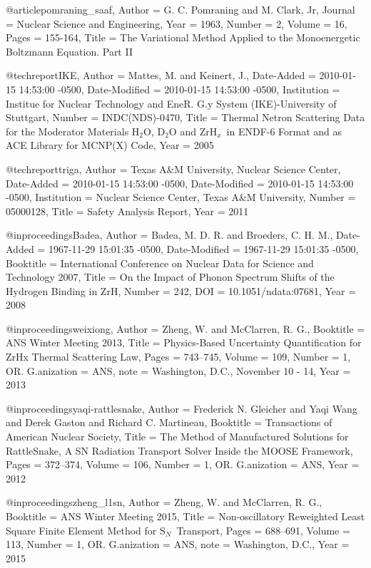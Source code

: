 @article{pomraning_saaf,
    Author = {G. C. Pomraning and M. Clark, Jr},
    Journal = {Nuclear Science and Engineering},
    Year = {1963},
    Number = {2},
    Volume = {16},
    Pages = {155-164},
    Title = {{The Variational Method Applied to the Monoenergetic Boltzmann Equation. Part II}}
}

@techreport{IKE,
	Author = {Mattes, M. and Keinert, J.},
	Date-Added = {2010-01-15 14:53:00 -0500},
	Date-Modified = {2010-01-15 14:53:00 -0500},
	Institution = {Institue for Nuclear Technology and EneR. G.y System (IKE)-University of Stuttgart},
	Number = {INDC(NDS)-0470},
	Title = {{Thermal Netron Scattering Data for the Moderator Materials H$_2$O, D$_2$O and ZrH$_x$\, in ENDF-$6$ Format and as ACE Library for MCNP(X) Code}},
	Year = {2005}}

@techreport{triga,
	Author = {Texas A\&M University, Nuclear Science Center},
	Date-Added = {2010-01-15 14:53:00 -0500},
	Date-Modified = {2010-01-15 14:53:00 -0500},
	Institution = {Nuclear Science Center, Texas A\&M University},
	Number = {05000128},
	Title = {{Safety Analysis Report}},
	Year = {2011}}

@inproceedings{Badea,
	Author = {Badea, M. D. R. and Broeders, C. H. M.},
	Date-Added = {1967-11-29 15:01:35 -0500},
	Date-Modified = {1967-11-29 15:01:35 -0500},
	Booktitle = {International Conference on Nuclear Data for Science and Technology 2007},
	Title = {{On the Impact of Phonon Spectrum Shifts of the Hydrogen Binding in ZrH}},
	Number = {242},
	DOI = {10.1051/ndata:07681},
	Year = {2008}}

@inproceedings{weixiong,
	Author = {Zheng, W. and McClarren, R. G.},
	Booktitle = {{ANS Winter Meeting 2013}},
	Title = {{Physics-Based Uncertainty Quantification for ZrHx Thermal Scattering Law}},
	Pages = {743--745},
	Volume = {109},
	Number = {1},
	OR. G.anization   = {ANS},
	note           = {Washington, D.C., November 10 - 14},
	Year = {2013}}

@inproceedings{yaqi-rattlesnake,
	Author = {Frederick N. Gleicher and Yaqi Wang and Derek Gaston and Richard C. Martineau},
	Booktitle = {{Transactions of American Nuclear Society}},
	Title = {{The Method of Manufactured Solutions for RattleSnake, A SN Radiation Transport Solver Inside the MOOSE Framework}},
	Pages = {372--374},
	Volume = {106},
	Number = {1},
	OR. G.anization   = {ANS},
	Year = {2012}}

@inproceedings{zheng_l1sn,
	Author = {Zheng, W. and McClarren, R. G.},
	Booktitle = {{ANS Winter Meeting 2015}},
	Title = {{Non-oscillatory Reweighted Least Square Finite Element Method for S$_N$\ Transport}},
	Pages = {688--691},
	Volume = {113},
	Number = {1},
	OR. G.anization   = {ANS},
	note           = {Washington, D.C.},
	Year = {2015}}

